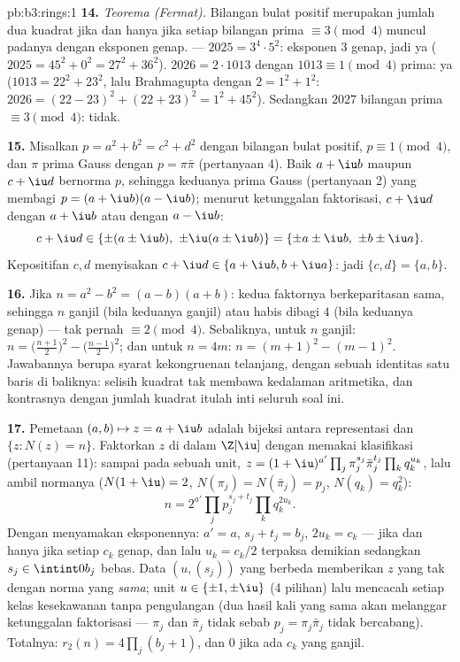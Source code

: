 \begin{solution}{pb:b3:rings:1}
\textbf{14.} \emph{Teorema (Fermat).} Bilangan bulat positif merupakan jumlah
dua kuadrat jika dan hanya jika setiap bilangan prima $\equiv 3 \pmod 4$
muncul padanya dengan eksponen genap. --- $2025 = 3^4 \cdot 5^2$:
eksponen $3$ genap, jadi ya ($2025 = 45^2 + 0^2 = 27^2 + 36^2$).
$2026 = 2 \cdot 1013$ dengan $1013 \equiv 1 \pmod 4$ prima: ya
($1013 = 22^2 + 23^2$, lalu Brahmagupta dengan $2 = 1^2+1^2$:
$2026 = (22 - 23)^2 + (22 + 23)^2 = 1^2 + 45^2$). Sedangkan $2027$ bilangan
prima $\equiv 3 \pmod 4$: tidak.

\textbf{15.} Misalkan $p = a^2 + b^2 = c^2 + d^2$ dengan bilangan bulat
positif, $p \equiv 1 \pmod 4$, dan $\pi$ prima Gauss dengan
$p = \pi\bar\pi$ (pertanyaan 4). Baik $a + \iu b$ maupun $c + \iu d$
bernorma $p$, sehingga keduanya prima Gauss (pertanyaan 2) yang membagi
$p = (a+\iu b)(a - \iu b)$; menurut ketunggalan faktorisasi, $c +
\iu d$  dengan $a + \iu b$ atau dengan $a - \iu b$:
\[
c + \iu d \in \{\pm(a \pm \iu b),\ \pm\iu(a \pm \iu b)\}
= \{\pm a \pm \iu b,\ \pm b \pm \iu a\}.
\]
Kepositifan $c, d$ menyisakan $c + \iu d \in \{a + \iu b, b + \iu
a\}$: jadi $\{c, d\} = \{a, b\}$.

\textbf{16.} Jika $n = a^2 - b^2 = (a-b)(a+b)$: kedua faktornya
berkeparitasan sama, sehingga $n$ ganjil (bila keduanya ganjil) atau habis dibagi
$4$ (bila keduanya genap) --- tak pernah $\equiv 2 \pmod 4$. Sebaliknya, untuk $n$
ganjil: $n = \bigl(\frac{n+1}2\bigr)^2 -
\bigl(\frac{n-1}2\bigr)^2$; dan untuk $n = 4m$: $n = (m+1)^2 - (m-1)^2$.
Jawabannya berupa syarat kekongruenan telanjang, dengan sebuah identitas
satu baris di baliknya: selisih kuadrat tak membawa kedalaman aritmetika,
dan kontrasnya dengan jumlah kuadrat itulah inti seluruh soal ini.

\textbf{17.} Pemetaan $(a, b) \mapsto z = a + \iu b$ adalah bijeksi
antara representasi dan $\{z : N(z) = n\}$. Faktorkan $z$ di dalam
 $\Z[\iu]$ dengan memakai klasifikasi (pertanyaan 11): sampai pada
sebuah unit, $z = (1+\iu)^{a'}\prod_j\pi_j^{s_j}\bar\pi_j^{t_j}
\prod_kq_k^{u_k}$, lalu ambil normanya ($N(1+\iu) = 2$,
$N(\pi_j) = N(\bar\pi_j) = p_j$, $N(q_k) = q_k^2$):
\[
n = 2^{a'}\prod_jp_j^{s_j + t_j}\prod_kq_k^{2u_k} .
\]
Dengan menyamakan eksponennya: $a' = a$, $s_j + t_j = b_j$, $2u_k = c_k$
---  jika dan hanya jika setiap $c_k$ genap, dan lalu $u_k = c_k/2$
terpaksa demikian sedangkan $s_j \in \intint0{b_j}$ bebas. Data
$(u, (s_j))$ yang berbeda memberikan $z$ yang tak  dengan norma yang
\emph{sama}; unit $u \in \{\pm1, \pm\iu\}$ (4 pilihan) lalu
mencacah setiap kelas kesekawanan tanpa pengulangan (dua hasil kali yang sama
akan melanggar ketunggalan faktorisasi ---
$\pi_j$ dan $\bar\pi_j$ tidak  sebab $p_j =
\pi_j\bar\pi_j$ tidak bercabang). Totalnya: $r_2(n) =
4\prod_j(b_j + 1)$, dan $0$ jika ada $c_k$ yang ganjil.


\end{solution}
